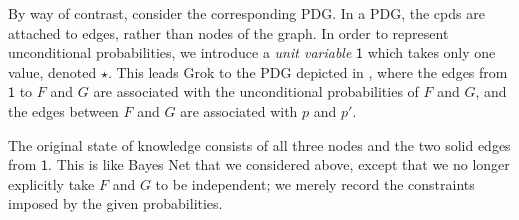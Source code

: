\documentclass[letterpaper]{article} %
\theoremstyle{plain}
\theoremstyle{definition}
\theoremstyle{remark}
\newcommand\mat[1]{\mathbf{#1}}
\newcommand{\var}[1]{\mathsf{#1}}
\begin{document}
\begin{example}
By way of contrast, consider the corresponding PDG. In a PDG, the cpds are
attached to edges, rather than nodes of the graph.
%
In order to represent unconditional probabilities, we introduce
a \emph{unit variable} $\var 1$ which 
takes only one value, denoted
$\star$. 
This leads Grok to 
the PDG depicted in ,
where the edges from $\var 1$ to $F$ and $G$ are associated with the
unconditional probabilities of $F$ and $G$, and the 
edges between $F$ and $G$ are associated with $p$ and $p'$.



The original state of knowledge consists of all three nodes and the two
solid
edges from $\var 1$. This is like Bayes Net that we considered above,
except that we 
no longer
explicitly
%
take  $F$ and $G$ to be independent; we merely record the constraints
imposed by the given probabilities.  
	

\end{example}
\end{document}
